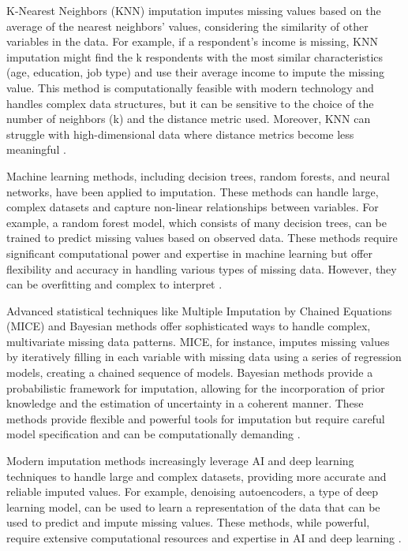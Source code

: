 K-Nearest Neighbors (KNN) imputation imputes missing values based on the average of the nearest neighbors' values, considering the similarity of other variables in the data. For example, if a respondent's income is missing, KNN imputation might find the k respondents with the most similar characteristics (age, education, job type) and use their average income to impute the missing value. This method is computationally feasible with modern technology and handles complex data structures, but it can be sensitive to the choice of the number of neighbors (k) and the distance metric used. Moreover, KNN can struggle with high-dimensional data where distance metrics become less meaningful \cite{pujianto2019k}.

Machine learning methods, including decision trees, random forests, and neural networks, have been applied to imputation. These methods can handle large, complex datasets and capture non-linear relationships between variables. For example, a random forest model, which consists of many decision trees, can be trained to predict missing values based on observed data. These methods require significant computational power and expertise in machine learning but offer flexibility and accuracy in handling various types of missing data. However, they can be overfitting and complex to interpret \cite{stekhoven2012missforest}.

Advanced statistical techniques like Multiple Imputation by Chained Equations (MICE) and Bayesian methods offer sophisticated ways to handle complex, multivariate missing data patterns. MICE, for instance, imputes missing values by iteratively filling in each variable with missing data using a series of regression models, creating a chained sequence of models. Bayesian methods provide a probabilistic framework for imputation, allowing for the incorporation of prior knowledge and the estimation of uncertainty in a coherent manner. These methods provide flexible and powerful tools for imputation but require careful model specification and can be computationally demanding \cite{Buuren2011MICEMI}.

Modern imputation methods increasingly leverage AI and deep learning techniques to handle large and complex datasets, providing more accurate and reliable imputed values. For example, denoising autoencoders, a type of deep learning model, can be used to learn a representation of the data that can be used to predict and impute missing values. These methods, while powerful, require extensive computational resources and expertise in AI and deep learning \cite{gondara2018mida}.

